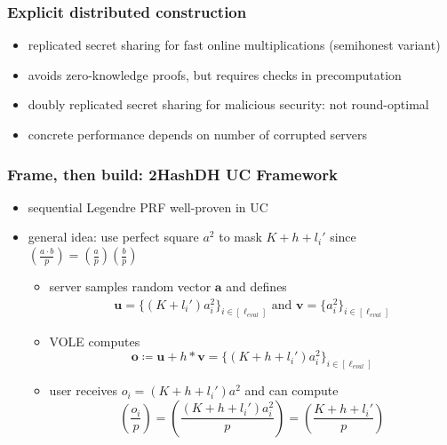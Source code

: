 \documentclass[aspectratio=169, 12pt,handout]{beamer}
\newcommand{\bv}[1]{\mathbf{#1}}
\begin{document}
\begin{frame}
  \frametitle{Explicit distributed construction~\cite{ESORICS:KalCheMit25}}
  \begin{itemize}
    \item replicated secret sharing for fast online multiplications (semihonest
      variant)\pause
    \item avoids zero-knowledge proofs, but requires checks in precomputation\pause
    \item doubly replicated secret sharing for malicious security: not
      round-optimal \pause
    \item concrete performance depends on number of corrupted servers
  \end{itemize}
\end{frame}

 \begin{frame}
   \frametitle{Frame, then build: 2HashDH UC Framework \cite{EC:BDFH25}}
   \begin{itemize}
     \item sequential Legendre PRF well-proven in UC \pause
     \item general idea: use perfect square $a^2$ to mask  
       $K+h+l_i'$ since $\left(\frac{a\cdot b}{p}\right)=\left(\frac{a}{p}\right) \left(\frac{b}{p}\right)$\pause
        \begin{itemize}
          \item server samples random vector $\bv{a}$ and defines
            \begin{align*}\bv{u}=\{(K+l_i')a_i^2\}_{i\in [\ell_{eval}]}\text{ and }
              \bv{v}=\{a_i^2\}_{i\in [\ell_{eval}]}\end{align*}\pause
              \item VOLE computes $$\bv{o}\coloneqq
                \bv{u}+h*\bv{v}=\{(K+h+l_i')a_i^2\}_{i\in [\ell_{eval}]}$$\pause
              \item user receives $o_i=(K+h+l_i')a^2$ and can compute $$
                \left(\frac{o_i}{p}\right)=
                \left(\frac{(K+h+l_i')a_i^2}{p}\right)=
                \left(\frac{K+h+l_i'}{p}\right)
                $$
        \end{itemize}
   \end{itemize}
 \end{frame}
\end{document}
